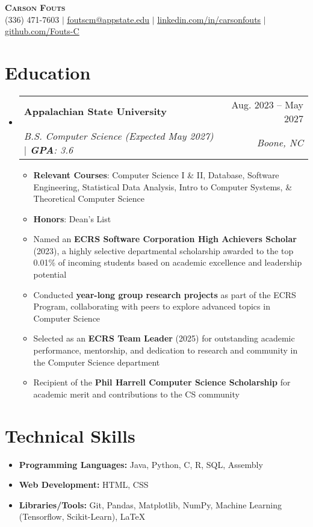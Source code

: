 \documentclass[letterpaper,11pt]{article}
\makeatletter
\newcommand{\resumeItem}[1]{
  \item\small{
    {#1 \vspace{-2pt}}
  }
}
\newcommand{\resumeSubheading}[4]{
  \vspace{-2pt}\item
    \begin{tabular*}{0.97\textwidth}[t]{l@{\extracolsep{\fill}}r}
      \textbf{#1} & #2 \\
      \textit{\small#3} & \textit{\small #4} \\
    \end{tabular*}\vspace{-7pt}
}
\newcommand{\resumeSubHeadingListStart}{\begin{itemize}[leftmargin=0.15in, label={}]}
\newcommand{\resumeSubHeadingListEnd}{\end{itemize}}
\newcommand{\resumeItemListStart}{\begin{itemize}}
\newcommand{\resumeItemListEnd}{\end{itemize}\vspace{-5pt}}
\makeatother
\begin{document}
\begin{center}
    \textbf{\Huge \scshape Carson Fouts} \\ \vspace{1pt}
    \small (336) 471-7603 $|$ \href{mailto:foutscm@appstate.edu}{\underline{foutscm@appstate.edu}} $|$ 
    \href{https://linkedin.com/in/carsonfouts}{\underline{linkedin.com/in/carsonfouts}}
    $|$ 
    \href{https://github.com/Fouts-C}{\underline{github.com/Fouts-C}}
\end{center}

\section{Education}
  \resumeSubHeadingListStart
    \resumeSubheading
      {Appalachian State University}{Aug. 2023 -- May 2027}
      {B.S. Computer Science (Expected May 2027) $|$ \textbf{GPA}: 3.6}
      {Boone, NC}
      \resumeItemListStart
        \resumeItem{\textbf{Relevant Courses}: Computer Science I \& II, Database, Software Engineering, Statistical Data Analysis, Intro to Computer Systems, \& Theoretical Computer Science}
        \resumeItem{\textbf{Honors}: Dean's List}
        \resumeItem{Named an \textbf{ECRS Software Corporation High Achievers Scholar} (2023), a highly selective departmental scholarship awarded to the top 0.01\% of incoming students based on academic excellence and leadership potential}
        \resumeItem{Conducted \textbf{year-long group research projects} as part of the ECRS Program, collaborating with peers to explore advanced topics in Computer Science}
        \resumeItem{Selected as an \textbf{ECRS Team Leader} (2025) for outstanding academic performance, mentorship, and dedication to research and community in the Computer Science department}
        \resumeItem{Recipient of the \textbf{Phil Harrell Computer Science Scholarship} for academic merit and contributions to the CS community}
        
      \resumeItemListEnd
  \resumeSubHeadingListEnd
  
\section{Technical Skills}
\begin{itemize}[leftmargin=0.15in, label={}]
    \item[] \textbf{Programming Languages:} Java, Python, C, R, SQL, Assembly
    \item[] \textbf{Web Development:} HTML, CSS
    \item[] \textbf{Libraries/Tools:} Git, Pandas, Matplotlib, NumPy, Machine Learning (Tensorflow, Scikit-Learn), LaTeX
\end{itemize}
 
\end{document}
